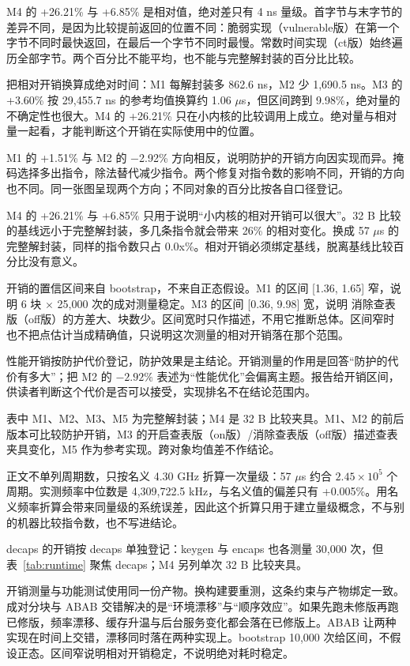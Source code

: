 M4 的 +26.21\% 与 +6.85\% 是相对值，绝对差只有 4 ns 量级。首字节与末字节的差异不同，是因为比较提前返回的位置不同：脆弱实现（vulnerable版）在第一个字节不同时最快返回，在最后一个字节不同时最慢。常数时间实现（ct版）始终遍历全部字节。两个百分比不能平均，也不能与完整解封装的百分比比较。

把相对开销换算成绝对时间：M1 每解封装多 862.6 ns，M2 少 1,690.5 ns。M3 的 +3.60\% 按 29,455.7 ns 的参考均值换算约 1.06 $\mu$s，但区间跨到 9.98\%，绝对量的不确定性也很大。M4 的 +26.21\% 只在小内核的比较调用上成立。绝对量与相对量一起看，才能判断这个开销在实际使用中的位置。%

M1 的 +1.51\% 与 M2 的 −2.92\% 方向相反，说明防护的开销方向因实现而异。掩码选择多出指令，除法替代减少指令。两个修复对指令数的影响不同，开销的方向也不同。同一张图呈现两个方向；不同对象的百分比按各自口径登记。

M4 的 +26.21\% 与 +6.85\% 只用于说明“小内核的相对开销可以很大”。32 B 比较的基线远小于完整解封装，多几条指令就会带来 26\% 的相对变化。换成 57 $\mu$s 的完整解封装，同样的指令数只占 0.0x\%。相对开销必须绑定基线，脱离基线比较百分比没有意义。

开销的置信区间来自 bootstrap，不来自正态假设。M1 的区间 [1.36, 1.65] 窄，说明 6 块 $\times$ 25,000 次的成对测量稳定。M3 的区间 [0.36, 9.98] 宽，说明 消除查表版（off版）的方差大、块数少。区间宽时只作描述，不用它推断总体。区间窄时也不把点估计当成精确值，只说明这次测量的相对开销落在那个范围。



性能开销按防护代价登记，防护效果是主结论。开销测量的作用是回答“防护的代价有多大”；把 M2 的 $-2.92\%$ 表述为“性能优化”会偏离主题。报告给开销区间，供读者判断这个代价是否可以接受，实现排名不在结论范围内。

表中 M1、M2、M3、M5 为完整解封装；M4 是 32 B 比较夹具。M1、M2 的前后版本可比较防护开销，M3 的开启查表版（on版）/消除查表版（off版）描述查表夹具变化，M5 作为参考实现。跨对象均值差不作结论。

正文不单列周期数，只按名义 4.30 GHz 折算一次量级：57 $\mu$s 约合 $2.45\times10^5$ 个周期。实测频率中位数是 4,309,722.5 kHz，与名义值的偏差只有 +0.005\%。用名义频率折算会带来同量级的系统误差，因此这个折算只用于建立量级概念，不与别的机器比较指令数，也不写进结论。%

decaps 的开销按 decaps 单独登记：keygen 与 encaps 也各测量 30,000 次，但表~\ref{tab:runtime} 聚焦 decaps；M4 另列单次 32 B 比较夹具。

开销测量与功能测试使用同一份产物。换构建要重测，这条约束与产物绑定一致。成对分块与 ABAB 交错解决的是“环境漂移”与“顺序效应”。如果先跑未修版再跑已修版，频率漂移、缓存升温与后台服务变化都会落在已修版上。ABAB 让两种实现在时间上交错，漂移同时落在两种实现上。bootstrap 10,000 次给区间，不假设正态。区间窄说明相对开销稳定，不说明绝对耗时稳定。

